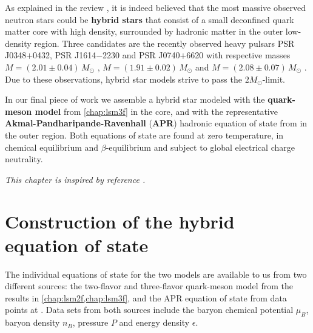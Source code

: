 As explained in the review \cite{ref:quark_star_review},
it is indeed believed that the most massive observed neutron stars
could be \textbf{hybrid stars} that consist of a small deconfined quark matter core with high density,
surrounded by hadronic matter in the outer low-density region.
Three candidates are the recently observed heavy pulsars PSR J0348$+$0432, PSR J1614$-$2230 and PSR J0740$+$6620
with respective masses $M = (2.01 \pm 0.04) \, M_\odot$ \cite{ref:antoniadis}, $M = (1.91 \pm 0.02) \, M_\odot$ \cite{ref:arzoumanian} and $M = (2.08 \pm 0.07) \, M_\odot$ \cite{ref:fonseca}.
Due to these observations, hybrid star models strive to pass the $2 M_\odot$-limit.

In our final piece of work
we assemble a hybrid star modeled with the \textbf{quark-meson model} from \cref{chap:lsm3f} in the core,
and with the representative \textbf{Akmal-Pandharipande-Ravenhall} (\textbf{APR}) hadronic equation of state from \cite{ref:apr} in the outer region.
Both equations of state are found at zero temperature, in chemical equilibrium and $\beta$-equilibrium and subject to global electrical charge neutrality.

\textit{This chapter is inspired by reference \cite{ref:quark_star_review}.}

\section{Construction of the hybrid equation of state}
\label{sec:hybrid:construction}

The individual equations of state for the two models are available to us from two different sources:
the two-flavor and three-flavor quark-meson model from the results in \cref{chap:lsm2f,chap:lsm3f},
and the APR equation of state from data points at \cite{ref:apr_data}.
Data sets from both sources include the baryon chemical potential $\mu_B$, baryon density $n_B$, pressure $P$ and energy density $\epsilon$.

